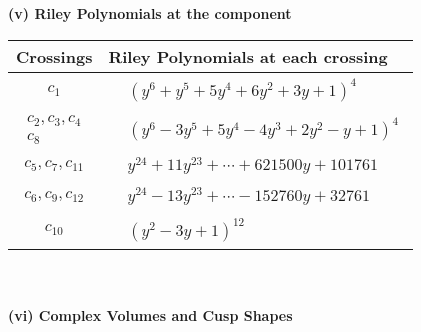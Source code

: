 \documentclass[1p]{elsarticle_modified}
\theoremstyle{definition}
\begin{document}
\newpage\renewcommand{\arraystretch}{1}
\flushleft \textbf{(v) Riley Polynomials at the component}\newline \\
\begin{tabular}{m{50pt}|m{274pt}}
Crossings & \hspace{64pt}Riley Polynomials at each crossing \\
\hline $$\begin{aligned}c_{1}\end{aligned}$$&$\begin{aligned}
&(y^6+y^5+5 y^4+6 y^2+3 y+1)^4
\end{aligned}$\\
\hline $$\begin{aligned}c_{2},c_{3},c_{4}\\c_{8}\end{aligned}$$&$\begin{aligned}
&(y^6-3 y^5+5 y^4-4 y^3+2 y^2- y+1)^4
\end{aligned}$\\
\hline $$\begin{aligned}c_{5},c_{7},c_{11}\end{aligned}$$&$\begin{aligned}
&y^{24}+11 y^{23}+\cdots+621500 y+101761
\end{aligned}$\\
\hline $$\begin{aligned}c_{6},c_{9},c_{12}\end{aligned}$$&$\begin{aligned}
&y^{24}-13 y^{23}+\cdots-152760 y+32761
\end{aligned}$\\
\hline $$\begin{aligned}c_{10}\end{aligned}$$&$\begin{aligned}
&(y^2-3 y+1)^{12}
\end{aligned}$\\
\hline
\end{tabular}\\~\\
\newpage\flushleft \textbf{(vi) Complex Volumes and Cusp Shapes}
\end{document}
